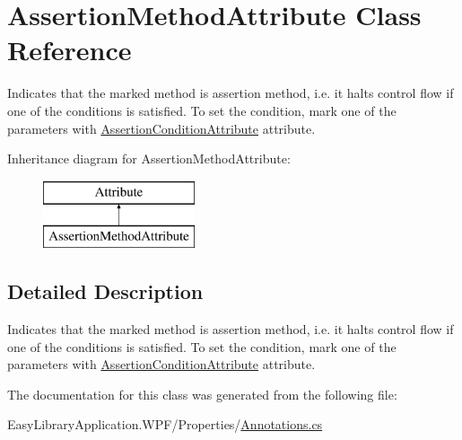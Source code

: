 \hypertarget{class_assertion_method_attribute}{}\section{Assertion\+Method\+Attribute Class Reference}
\label{class_assertion_method_attribute}


Indicates that the marked method is assertion method, i.\+e. it halts control flow if one of the conditions is satisfied. To set the condition, mark one of the parameters with \mbox{\hyperlink{class_assertion_condition_attribute}{Assertion\+Condition\+Attribute}} attribute.  


Inheritance diagram for Assertion\+Method\+Attribute\+:\begin{figure}[H]
\begin{center}
\leavevmode
\includegraphics[height=2.000000cm]{class_assertion_method_attribute}
\end{center}
\end{figure}


\subsection{Detailed Description}
Indicates that the marked method is assertion method, i.\+e. it halts control flow if one of the conditions is satisfied. To set the condition, mark one of the parameters with \mbox{\hyperlink{class_assertion_condition_attribute}{Assertion\+Condition\+Attribute}} attribute. 



The documentation for this class was generated from the following file\+:\begin{DoxyCompactItemize}
\item 
Easy\+Library\+Application.\+W\+P\+F/\+Properties/\mbox{\hyperlink{_annotations_8cs}{Annotations.\+cs}}\end{DoxyCompactItemize}
